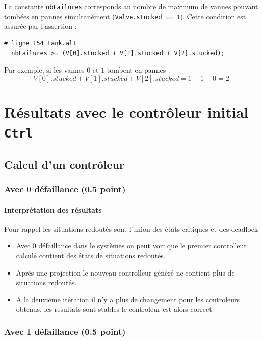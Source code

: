 \documentclass[a4paper]{book}
\begin{document}
La constante \texttt{nbFailures} corresponds au nombre de maximum de vannes pouvant tombées
en pannes simultanément (\texttt{Valve.stucked == 1}).
Cette condition est assurée par l'assertion :
\begin{verbatim}
# ligne 154 tank.alt
  nbFailures >= (V[0].stucked + V[1].stucked + V[2].stucked);
\end{verbatim}

Par exemple, si les vannes $0$ et $1$ tombent en pannes :
$$
V[0].stucked + V[1].stucked + V[2].stucked = 1 + 1 + 0 = 2
$$

\section{Résultats avec le contrôleur initial {\tt Ctrl}}
\subsection{Calcul d'un contrôleur}
\subsubsection{Avec 0 défaillance (0.5 point)}

\paragraph{Interprétation des résultats}
Pour rappel les situations redoutés sont l'union des états critiques et des deadlock 
\begin{itemize}
    \item Avec 0 défaillance dans le systèmes on peut voir que le premier controlleur calculé
contient des états de situations redoutés.
    \item Après une projection le nouveau controlleur généré ne contient plus de situations redoutés.
    \item A la deuxième itération il n'y a plus de changement pour les controleurs obtenus,
les resultats sont stables le controleur est alors correct.
\end{itemize}

\subsubsection{Avec 1 défaillance (0.5 point)}

\end{document}
